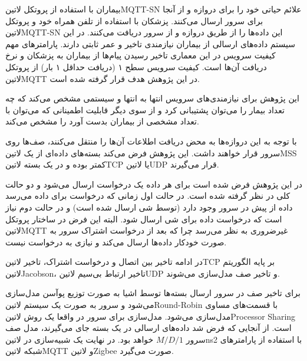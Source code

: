 بیماران با استفاده از پروتکل ‌لاتین{MQTT-SN} علائم حیاتی خود را برای دروازه و از آنجا برای سرور ارسال می‌کنند.
پزشکان با استفاده از تلفن همراه خود و پروتکل ‌لاتین{MQTT-SN} این داده‌ها را از طریق دروازه و از سرور دریافت می‌کنند.
در این سیستم داده‌های ارسالی از بیماران نیازمندی تاخیر و عمر ثابتی دارند.
پارامترهای مهم کیفیت سرویس در این معماری تاخیر رسیدن پیام‌ها از بیماران به پزشکان و نرخ دریافت آن‌ها است.
کیفیت سرویس سطح ۱ (دریافت حداقل ۱ بار) از پروتکل ‌لاتین{MQTT} در این پژوهش هدف قرار گرفته شده است.

این پژوهش برای نیازمندی‌های سرویس انتها به انتها و سیستمی مشخص می‌کند که چه تعداد بیمار را می‌توان پشتیبانی کرد
و از سوی دیگر قابلیت اطمینانی که می‌توان با تعداد مشخصی از بیماران بدست آورد را مشخص می‌کند.

با توجه به این دروازه‌ها به محض دریافت اطلاعات آن‌ها را منتقل می‌کنند، صف‌ها روی سرور قرار خواهند داشت.
این پژوهش فرض می‌کند بسته‌های داده‌ای از یک ‌لاتین{MSS} کمتر بوده و در یک بسته ‌لاتین{TCP} یا ‌لاتین{UDP}
قرار می‌گیرند.

در این پژوهش فرض شده است برای هر داده یک درخواست ارسال می‌شود و دو حالت کلی در نظر گرفته شده است. در حالت اول
زمانی که درخواست برای داده می‌رسد داده از پیش در سرور وجود دارد (توسط شی ارسال شده است) و در حالت دوم نیاز است
که درخواست داده برای شی ارسال شود. البته این فرض در ساختار پروتکل ‌لاتین{MQTT} غیرضروری به نظر می‌رسد چرا که
بعد از درخواست اشتراک سرور به صورت خودکار داده‌ها ارسال می‌کند و نیازی به درخواست نیست.

در ادامه تاخیر بین اتصال و درخواست اشتراک، تاخیر ‌لاتین{TCP} بر پایه الگوریتم ‌لاتین{Jacobson}،
تاخیر ارتباط بی‌سیم ‌لاتین{UDP} و تاخیر صف مدل‌سازی می‌شوند.

برای تاخیر صف در سرور ارسال بسته‌ها توسط اشیا به صورت توزیع پوآسن مدل‌سازی می‌شود و سرور به صورت
یک سیستم ‌لاتین{Round-Robin} با قسمت‌های مساوی مدل‌سازی می‌شود.
مدل‌سازی برای سرور در واقعا یک روش ‌لاتین{Processor Sharing} است.
از آنجایی که فرض شد داده‌های ارسالی در یک بسته جای می‌گیرند، مدل صف سرور $M/D/1$ خواهد بود.
در نهایت یک شبیه‌سازی در ‌لاتین{ns2} با استفاده از پارامترهای شبکه ‌لاتین{MQTT} و ‌لاتین{Zigbee}
صورت می‌گیرد.
